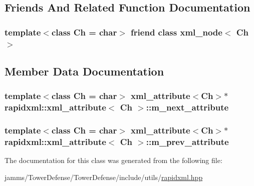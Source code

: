 \subsection{Friends And Related Function Documentation}
\hypertarget{singletonrapidxml_1_1xml__attribute_aa7e464ce3fe512598ff8dda47291941f}{
\subsubsection[{xml\+\_\+node$<$ Ch $>$}]{\setlength{\rightskip}{0pt plus 5cm}template$<$class Ch = char$>$ friend class {\bf xml\+\_\+node}$<$ Ch $>$\hspace{0.3cm}{\ttfamily [friend]}}}\label{singletonrapidxml_1_1xml__attribute_aa7e464ce3fe512598ff8dda47291941f}


\subsection{Member Data Documentation}
\hypertarget{singletonrapidxml_1_1xml__attribute_a3254e4b040a9b71c6b6d1c27ec03352a}{
\subsubsection[{m\+\_\+next\+\_\+attribute}]{\setlength{\rightskip}{0pt plus 5cm}template$<$class Ch = char$>$ {\bf xml\+\_\+attribute}$<$Ch$>$$\ast$ {\bf rapidxml\+::xml\+\_\+attribute}$<$ Ch $>$\+::m\+\_\+next\+\_\+attribute\hspace{0.3cm}{\ttfamily [private]}}}\label{singletonrapidxml_1_1xml__attribute_a3254e4b040a9b71c6b6d1c27ec03352a}
\hypertarget{singletonrapidxml_1_1xml__attribute_a204438287a5ad384405584726a1d8559}{
\subsubsection[{m\+\_\+prev\+\_\+attribute}]{\setlength{\rightskip}{0pt plus 5cm}template$<$class Ch = char$>$ {\bf xml\+\_\+attribute}$<$Ch$>$$\ast$ {\bf rapidxml\+::xml\+\_\+attribute}$<$ Ch $>$\+::m\+\_\+prev\+\_\+attribute\hspace{0.3cm}{\ttfamily [private]}}}\label{singletonrapidxml_1_1xml__attribute_a204438287a5ad384405584726a1d8559}


The documentation for this class was generated from the following file\+:\begin{DoxyCompactItemize}
\item 
jamms/\+Tower\+Defense/\+Tower\+Defense/include/utils/\hyperlink{rapidxml_8hpp}{rapidxml.\+hpp}\end{DoxyCompactItemize}
